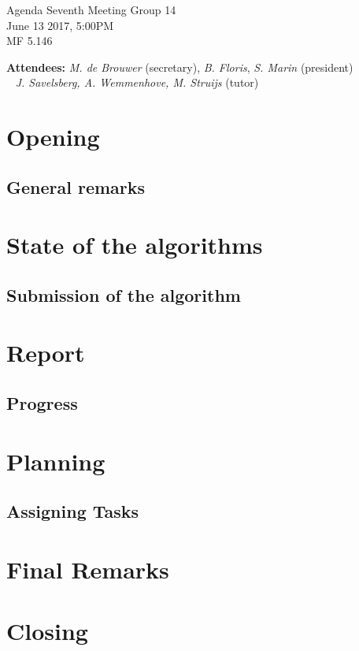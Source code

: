 \documentclass[a4paper,twoside,11pt]{article}
\title{}
\date{}
\begin{document}

\begin{center}
	\Huge{Agenda Seventh Meeting Group 14}
	\\\vspace*{2mm}
	\Large{June 13 2017, 5:00PM}
	\\\vspace*{2mm}
	\large{MF 5.146}
	\\
\end{center}

\textbf{Attendees:} \textit{M. de Brouwer} (secretary),
\textit{B. Floris}, \textit{S. Marin} (president)
\\\indent\qquad\,\,\,\,\,\qquad\quad \textit{J. Savelsberg, A. Wemmenhove, M. Struijs} (tutor)

\section{Opening}
\subsection{General remarks}

\section{State of the algorithms}
\subsection{Submission of the algorithm}

\section{Report}
\subsection{Progress}

\section{Planning}
\subsection{Assigning Tasks}

\section{Final Remarks}

\section{Closing}
\end{document}
